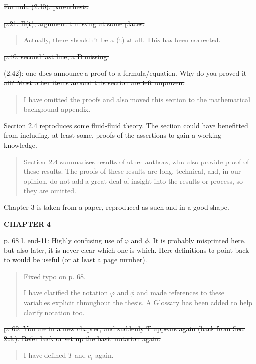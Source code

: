\documentclass[a4paper]{article}
\begin{document}
\st{Formula (2.10): parenthesis.}

\st{p.21: B(t), argument t missing at some places.}
\begin{quote}
    Actually, there shouldn't be a (t) at all. This has been corrected.
\end{quote}

\st{p.40: second last line, a D missing.}

\st{(2.42): one does announce a proof to a formula/equation. Why do you proved it all? Most other items around this section are left unproven.}
\begin{quote}
    I have omitted the proofs and also moved this section to the mathematical background appendix.
\end{quote}

Section 2.4 reproduces some fluid-fluid theory. The section could have benefitted
from including, at least some, proofs of the assertions to gain a working knowledge.
\begin{quote}
    Section~2.4 summarises results of other authors, who also provide proof of these results. The proofs of these results are long, technical, and, in our opinion, do not add a great deal of insight into the results or process, so they are omitted. 
\end{quote}

Chapter 3 is taken from a paper, reproduced as such and in a good shape.

\noindent\textbf{CHAPTER 4}

p. 68 l. end-11: Highly confusing use of \(\varphi\) and \(\phi\). It is probably misprinted here, but also later, it is never clear which one is which. Here definitions to point back to would be useful (or at least a page number).
\begin{quote}
    Fixed typo on p. 68.

    I have clarified the notation \(\varphi\) and \(\phi\) and made references to these variables explicit throughout the thesis. A Glossary has been added to help clarify notation too. 
\end{quote}

\st{p. 69: You are in a new chapter, and suddenly T appears again (back from Sec. 2.3.). Refer back or set up the basic notation again.}
\begin{quote}
    I have defined \(T\) and \(c_i\) again. 
\end{quote}
\end{document}
